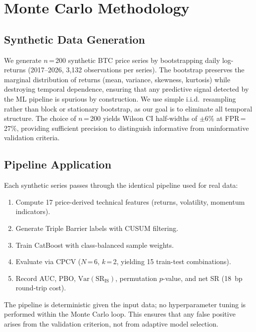 \documentclass[sigconf,anonymous,review]{acmart}
\begin{document}
\section{Monte Carlo Methodology}
\label{app:mc}

\subsection{Synthetic Data Generation}

We generate $n$\,=\,200 synthetic BTC price series by bootstrapping
daily log-returns (2017--2026, 3{,}132 observations per series).
The bootstrap preserves the marginal distribution of returns (mean,
variance, skewness, kurtosis) while destroying temporal dependence,
ensuring that any predictive signal detected by the ML pipeline is
spurious by construction. We use simple i.i.d.\ resampling rather
than block or stationary bootstrap, as our goal is to eliminate all
temporal structure. The choice of $n$\,=\,200 yields Wilson CI
half-widths of $\pm$6\% at FPR\,=\,27\%, providing sufficient
precision to distinguish informative from uninformative validation
criteria.

\subsection{Pipeline Application}

Each synthetic series passes through the identical pipeline used
for real data:

\begin{enumerate}
\item Compute 17 price-derived technical features (returns,
volatility, momentum indicators).
\item Generate Triple Barrier labels with CUSUM filtering.
\item Train CatBoost with class-balanced sample weights.
\item Evaluate via CPCV ($N$\,=\,6, $k$\,=\,2, yielding 15
train-test combinations).
\item Record AUC, PBO, $\mathrm{Var}(\mathrm{SR}_{\mathrm{IS}})$,
permutation $p$-value, and net SR (18~bp round-trip cost).
\end{enumerate}

The pipeline is deterministic given the input data; no
hyperparameter tuning is performed within the Monte Carlo loop.
This ensures that any false positive arises from the validation
criterion, not from adaptive model selection.
\end{document}
